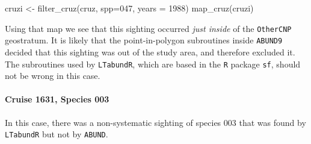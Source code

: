 \documentclass[
]{book}
\newenvironment{Shaded}{\begin{snugshade}}{\end{snugshade}}
\newcommand{\AttributeTok}[1]{\textcolor[rgb]{0.77,0.63,0.00}{#1}}
\newcommand{\DecValTok}[1]{\textcolor[rgb]{0.00,0.00,0.81}{#1}}
\newcommand{\FunctionTok}[1]{\textcolor[rgb]{0.00,0.00,0.00}{#1}}
\newcommand{\NormalTok}[1]{#1}
\newcommand{\OtherTok}[1]{\textcolor[rgb]{0.56,0.35,0.01}{#1}}
\newcommand{\StringTok}[1]{\textcolor[rgb]{0.31,0.60,0.02}{#1}}
\begin{document}
\begin{Shaded}
\begin{Highlighting}[]
\NormalTok{cruzi }\OtherTok{\textless{}{-}} \FunctionTok{filter\_cruz}\NormalTok{(cruz, }\AttributeTok{spp=}\StringTok{\textquotesingle{}047\textquotesingle{}}\NormalTok{, }\AttributeTok{years =} \DecValTok{1988}\NormalTok{)}
\FunctionTok{map\_cruz}\NormalTok{(cruzi)}
\end{Highlighting}
\end{Shaded}

Using that map we see that this sighting occurred \emph{just inside} of the \texttt{OtherCNP} geostratum. It is likely that the point-in-polygon subroutines inside \texttt{ABUND9} decided that this sighting was out of the study area, and therefore excluded it. The subroutines used by \texttt{LTabundR}, which are based in the \texttt{R} package \texttt{sf}, should not be wrong in this case.

\hypertarget{cruise-1631-species-003}{%
\paragraph*{Cruise 1631, Species 003}\label{cruise-1631-species-003}}

In this case, there was a non-systematic sighting of species 003 that was found by \texttt{LTabundR} but not by \texttt{ABUND}.
\end{document}

